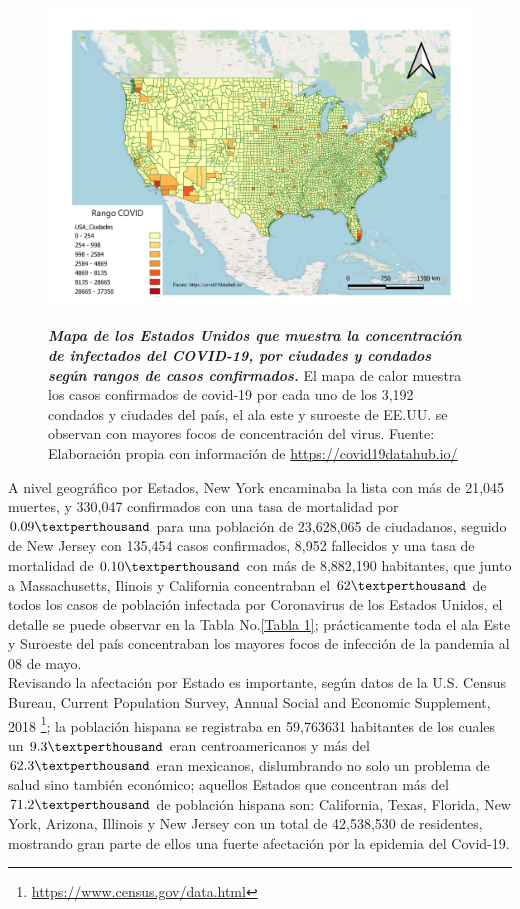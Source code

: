 \begin{figure}[H]
	\centering
	\includegraphics[width=1\linewidth]{Imagenes/MapaUSA2}
	\caption{\textbf{\textit{Mapa de los Estados Unidos que muestra la concentración de infectados del COVID-19, por ciudades y condados según rangos de casos confirmados.}} {\small El mapa de calor muestra los casos confirmados de covid-19 por cada uno de los 3,192 condados y ciudades del país, el ala este y suroeste de EE.UU. se observan con mayores focos de concentración del virus. Fuente: Elaboración propia con información de \href{https://covid19datahub.io/}{https://covid19datahub.io/}}
	} 
	\label{fig:1}
	\resizebox{20 cm}{!} { }
	
\end{figure}

A nivel geográfico por Estados, New York encaminaba la lista con más de 21,045 muertes, y 330,047 confirmados con una tasa de mortalidad por $0.09 \textperthousand$ para una población de 23,628,065 de ciudadanos, seguido de New Jersey con 135,454 casos confirmados, 8,952 fallecidos y una tasa de mortalidad de $0.10 \textperthousand$ con más de 8,882,190 habitantes, que junto a Massachusetts, Ilinois y California concentraban el $62 \textperthousand$ de todos los casos de población infectada por Coronavirus de los Estados Unidos, el detalle se puede observar en la Tabla No.\eqref{Tabla 1}; prácticamente toda el ala Este y Suroeste del país concentraban los mayores focos de infección de la pandemia al 08 de mayo.\\

Revisando la afectación por Estado es importante, según datos de la U.S. Census Bureau, Current Population Survey, Annual Social and Economic Supplement, 2018 \footnote{\href{https://www.census.gov/data.html}{https://www.census.gov/data.html}}; la población hispana se registraba en 59,763631 habitantes de los cuales un $9.3 \textperthousand$ eran centroamericanos y más del $62.3 \textperthousand$ eran mexicanos, dislumbrando no solo un problema de salud sino también económico; aquellos Estados que concentran más del $71.2 \textperthousand$ de población hispana son: California, Texas, Florida, New York, Arizona, Illinois y New Jersey con un total de 42,538,530 de residentes, mostrando gran parte de ellos una fuerte afectación por la epidemia del Covid-19.  

